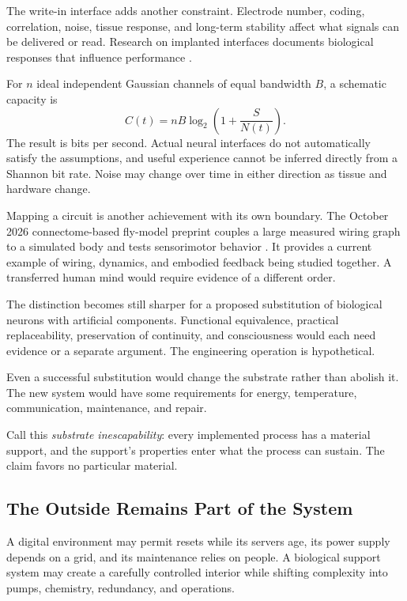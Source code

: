 \documentclass[11pt,openany]{book}
\begin{document}
The write-in interface adds another constraint. Electrode number, coding, correlation, noise, tissue response, and long-term stability affect what signals can be delivered or read. Research on implanted interfaces documents biological responses that influence performance \cite{polikov2005response}.

For $n$ ideal independent Gaussian channels of equal bandwidth $B$, a schematic capacity is
\begin{equation}
 C(t)=nB\log_2\left(1+\frac{S}{N(t)}\right).
\end{equation}
The result is bits per second. Actual neural interfaces do not automatically satisfy the assumptions, and useful experience cannot be inferred directly from a Shannon bit rate. Noise may change over time in either direction as tissue and hardware change.

Mapping a circuit is another achievement with its own boundary. The October 2026 connectome-based fly-model preprint couples a large measured wiring graph to a simulated body and tests sensorimotor behavior \cite{minnick2026sensorimotor}. It provides a current example of wiring, dynamics, and embodied feedback being studied together. A transferred human mind would require evidence of a different order.

The distinction becomes still sharper for a proposed substitution of biological neurons with artificial components. Functional equivalence, practical replaceability, preservation of continuity, and consciousness would each need evidence or a separate argument. The engineering operation is hypothetical.

Even a successful substitution would change the substrate rather than abolish it. The new system would have some requirements for energy, temperature, communication, maintenance, and repair.

Call this \emph{substrate inescapability}: every implemented process has a material support, and the support's properties enter what the process can sustain. The claim favors no particular material.

\subsection{The Outside Remains Part of the System}

A digital environment may permit resets while its servers age, its power supply depends on a grid, and its maintenance relies on people. A biological support system may create a carefully controlled interior while shifting complexity into pumps, chemistry, redundancy, and operations.
\end{document}
